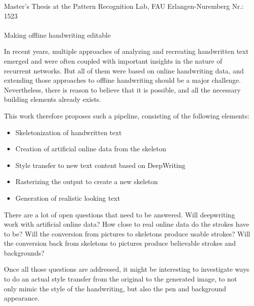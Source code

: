 \documentclass[12pt,a4paper]{article}
\begin{document}
\begin{center}
	Master's Thesis at the Pattern Recognition Lab, FAU Erlangen-Nuremberg \hfill Nr.: 1523 \\[5mm]
																				
	\mbox{}\\
	{\Large Making offline handwriting editable}\\[7mm]
			
\end{center}

In recent years, multiple approaches of analyzing and recreating handwritten text emerged \cite{graves} \cite{DeepWriting} and were often coupled with important insights in the nature of recurrent networks. But all of them were based on online handwriting data, and extending those approaches to offline handwriting should be a major challenge. Nevertheless, there is reason to believe that it is possible, and all the necessary building elements already exists.

This work therefore proposes such a pipeline, consisting of the following elements:
\begin{itemize}
  	\setlength\itemsep{0em}
	\item Skeletonization of handwritten text \cite{chineseSkeletonization}
	\item Creation of artificial online data from the skeleton
	\item Style transfer to new text content based on DeepWriting \cite{DeepWriting}
	\item Rasterizing the output to create a new skeleton
	\item Generation of realistic looking text \cite{pix2pix}
\end{itemize}

There are a lot of open questions that need to be answered.
Will deepwriting work with artificial online data? How close to real online data do the strokes have to be? Will the conversion from pictures to skeletons produce usable strokes? Will the conversion back from skeletons to pictures produce believable strokes and backgrounds?

Once all those questions are addressed, it might be interesting to investigate ways to do an actual style transfer from the original to the generated image, to not only mimic the style of the handwriting, but also the pen and background appearance.\\
\end{document}
